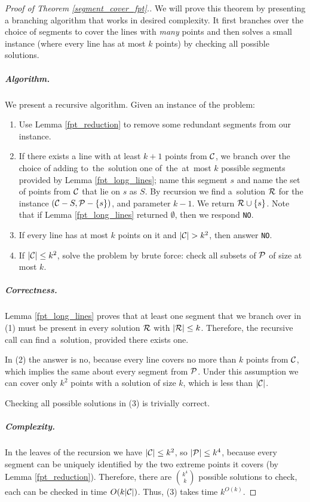 \begin{proof}[Proof of Theorem \ref{segment_cover_fpt}.]
We will prove this theorem by presenting a branching algorithm that
works in desired complexity. It first branches over the
choice of segments to cover the lines with \textit{many} points
and then solves a small instance (where every line has at most $k$ points)
by checking all possible solutions.

\subparagraph{Algorithm.}
We present a recursive algorithm. Given an instance of the problem:

\begin{enumerate}[label={(\arabic*)}]
\item Use Lemma \ref{fpt_reduction} to remove some redundant segments from our instance.
\item If there exists a line with at least $k+1$ points from $\mathcal{C}$,
we branch over the choice of adding to~the~solution
one of~the~at~most $k$ possible segments
provided by Lemma \ref{fpt_long_lines}; name this segment $s$
and name the set of points from $\mathcal{C}$ that lie on $s$ as $S$.
By recursion we find a~solution $\mathcal{R}$
for the instance $(\mathcal{C} - S, \mathcal{P} - \{s\})$,
and parameter $k-1$. We return $\mathcal{R} \cup \{s\}$.
Note that if Lemma \ref{fpt_long_lines} returned $\emptyset$,
then we respond \texttt{NO}.
\item If every line has at most $k$ points on it and $|\mathcal{C}| > k^2$,
then answer \texttt{NO}.
\item If $|\mathcal{C}| \le k^2$, solve the problem by brute force:
check all subsets of $\mathcal{P}$ of size at most $k$.
\end{enumerate}

\subparagraph{Correctness.}

Lemma \ref{fpt_long_lines} proves that at least one segment that we
branch over in (1) must be present in every solution $\mathcal{R}$ with $|\mathcal{R}| \le k$.
Therefore, the recursive call can find a~solution, provided there exists one.

In (2) the answer is no, because every line covers no more than $k$ points
from $\mathcal{C}$, which implies the same about every segment from $\mathcal{P}$.
Under this assumption
we can cover only $k^2$ points with a solution of size $k$, which is less
than $|\mathcal{C}|$.

Checking all possible solutions in (3) is trivially correct.


\subparagraph{Complexity.}

In the leaves of the recursion we have $|\mathcal{C}| \le k^2$, so $|\mathcal{P}| \le k^4$,
because every segment can be uniquely identified by the two extreme points it covers
(by Lemma \ref{fpt_reduction}). Therefore, there are $\binom{k^4}{k}$
possible solutions to check, each can be checked in time $O(k|\mathcal{C}|)$.
Thus, (3) takes time $k^{O(k)}$.



\end{proof}
